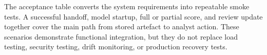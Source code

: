 The acceptance table converts the system requirements into repeatable smoke
tests. A successful handoff, model startup, full or partial score, and review
update together cover the main path from stored artefact to analyst action.
These scenarios demonstrate functional integration, but they do not replace
load testing, security testing, drift monitoring, or production recovery tests.
